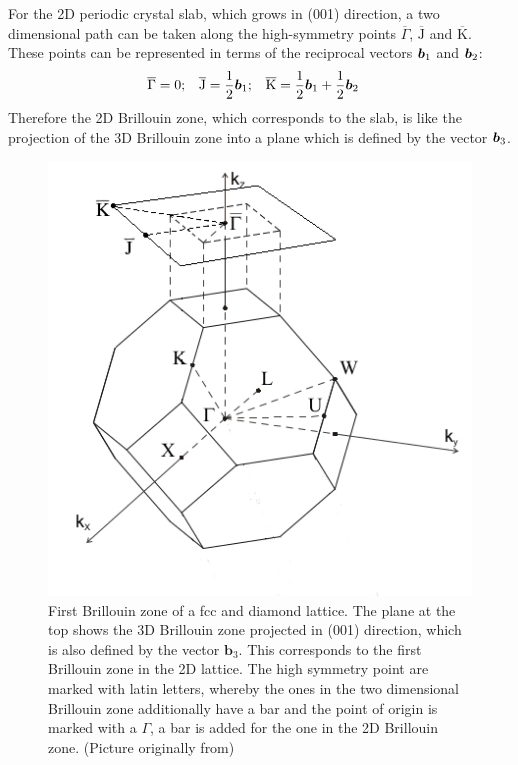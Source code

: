 		For the 2D periodic crystal slab, which grows in (001) direction, a two dimensional path can be taken along the high-symmetry points $\overline{\Gamma}$, $\overline{\text{J}}$ and $\overline{\text{K}}$. These points can be represented in terms of the reciprocal vectors $\boldsymbol{b}_1$ and $\boldsymbol{b}_2$:
		\begin{align} \label{2D-BZ-points}
			\overline{\Gamma}&= 0;&
			\overline{\text{J}} &= \frac{1}{2} \boldsymbol{b}_1 ;&
			\overline{\text{K}}&= \frac{1}{2} \boldsymbol{b}_1 + \frac{1}{2} \boldsymbol{b}_2 
		\end{align}
		Therefore the 2D Brillouin zone, which corresponds to the slab, is like the projection of the 3D Brillouin zone into a plane which is defined by the vector $\boldsymbol{b}_3$. 
	\begin{figure}[t!]
		\centering
		\includegraphics[width=.5\linewidth]{andere_bilder/brillouin_zone_001_2.jpg}
		\caption{First Brillouin zone of a fcc and diamond lattice. 
			The plane at the top shows the 3D Brillouin zone projected in (001) direction, which is also defined by the vector $\boldsymbol{b}_3$. This corresponds to the first Brillouin zone in the 2D lattice. The high symmetry point are marked with latin letters, whereby the ones in the two dimensional Brillouin zone additionally have a bar and the point of origin is marked with a $\Gamma$, a bar is added for the one in the 2D Brillouin zone.  
			(Picture originally from\cite{aluminium})}\label{brillouin_zone}
	\end{figure}	
